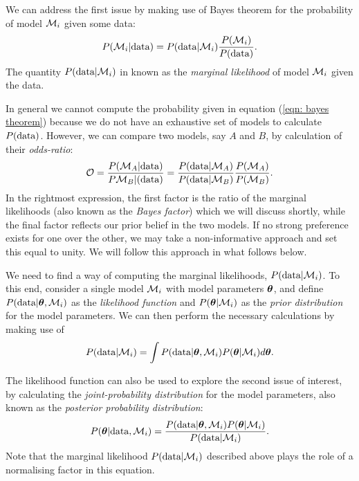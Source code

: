 \documentclass[../full_thesis/full_thesis.tex]{subfiles}
\begin{document}
We can address the first issue by making use of Bayes theorem for the
probability of model $\mathcal{M}_{i}$ given some data:
\begin{equation}
    P(\mathcal{M}_{i} | \textrm{data}) = P(\textrm{data} | \mathcal{M}_{i}) \frac{P(\mathcal{M}_{i})}{P(\textrm{data})}.
\label{eqn: bayes theorem}
\end{equation}
The quantity $P(\textrm{data} | \mathcal{M}_{i})$ in known as the \emph{marginal likelihood} of
model $\mathcal{M}_i$ given the data.

In general we cannot compute the probability given in equation (\ref{eqn: bayes
theorem})  because we do not have an exhaustive set of models to calculate
$P(\textrm{data})$.  However, we can compare two models, say $A$ and $B$, by
calculation of their \emph{odds-ratio}:
\begin{equation}
\mathcal{O} = \frac{P(\mathcal{M}_{A}|\textrm{data})}{P\mathcal{M}_{B}|(\textrm{data})}=
            \frac{P(\textrm{data}|\mathcal{M}_{A})}{P(\textrm{data}|\mathcal{M}_{B})}
            \frac{P(\mathcal{M}_{A})}{P(\mathcal{M}_{B})}.
\label{eqn: odds-ratio}
\end{equation}
In the rightmost expression, the first factor is the ratio of the marginal
likelihoods (also known as the \emph{Bayes factor}) which we will discuss
shortly, while the final factor reflects our prior belief in the two models. If
no strong preference exists for one over the other, we may take a
non-informative approach and set this equal to unity.  We will follow this
approach in what follows below.

We need to find a way of computing the marginal likelihoods, $P(\textrm{data} |
\mathcal{M}_{i})$.  To this end, consider a single model  $\mathcal{M}_{i}$ with model parameters
$\boldsymbol{\theta}$, and define $P(\textrm{data}| \boldsymbol{\theta}, \mathcal{M}_{i})$ as the \emph{likelihood
function} and $P(\boldsymbol{\theta} | \mathcal{M}_{i})$ as the \emph{prior distribution} for the
model parameters.   We can then perform the necessary calculations by making
use of
\begin{equation}
    P(\textrm{data}|\mathcal{M}_{i}) = \int
                      P(\textrm{data}| \boldsymbol{\theta}, \mathcal{M}_{i})P(\boldsymbol{\theta} | \mathcal{M}_{i})
                      d\boldsymbol{\theta}.
\label{eqn: marginal likelihood}
\end{equation}

The likelihood function can also be used to explore the second issue of
interest, by calculating the \emph{joint-probability distribution} for the
model parameters, also known as the \emph{posterior probability distribution}:
\begin{align}
P(\boldsymbol{\theta}| \textrm{data}, \mathcal{M}_{i}) =
\frac{P(\textrm{data}| \boldsymbol{\theta}, \mathcal{M}_{i})P(\boldsymbol{\theta} | \mathcal{M}_{i})}
{P(\textrm{data}| \mathcal{M}_{i})}.
\end{align}
Note that the marginal likelihood $P(\textrm{data}| \mathcal{M}_{i})$ described above plays the
role of a normalising factor in this equation.
\end{document}
